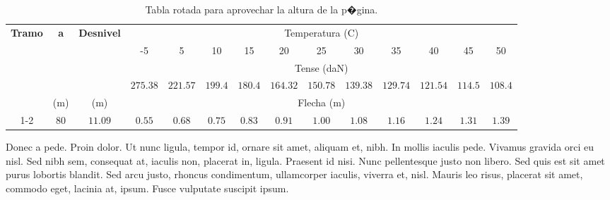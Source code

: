 \begin{sidewaystable}			
	\begin{center}
		\begin{tabular}{|c|c|c|c|c|c|c|c|c|c|c|c|c|c|}
			\hline
				\multirow{5}{1cm}{\scriptsize{\textbf{Tramo}}}	&
				\multirow{4}{0.15cm}{\scriptsize{\textbf{a}}}	&
				\multirow{4}{1.25cm}{\scriptsize{\textbf{Desnivel}}}	&
				\multicolumn{11}{|c|}{\scriptsize{Temperatura (\textdegree C)}}\\
			\cline{4-14}
				&
				&
				&
				\scriptsize{-5} &
				\scriptsize{5} &
				\scriptsize{10} &
				\scriptsize{15} &
				\scriptsize{20} &
				\scriptsize{25} &
				\scriptsize{30} &
				\scriptsize{35} &
				\scriptsize{40} &
					\scriptsize{45} &
					\scriptsize{50} \\
				\cline{4-14}
					&
					&
					&
					\multicolumn{11}{|c|}{\scriptsize{Tense (daN)}}\\
				\cline{4-14}
					&
					&
					&
					\scriptsize{$275.38$} &
					\scriptsize{$221.57$} &
					\scriptsize{$199.4$} &
					\scriptsize{$180.4$} &
					\scriptsize{$164.32$} &
					\scriptsize{$150.78$} &
					\scriptsize{$139.38$} &
					\scriptsize{$129.74$} &
					\scriptsize{$121.54$} &
					\scriptsize{$114.5$} &
					\scriptsize{$108.4$} \\
				\cline{4-14}
					&
					\scriptsize{(m)} &
					\scriptsize{(m)}	&
					\multicolumn{11}{|c|}{\scriptsize{Flecha (m)}}\\
				\hline
				\hline
					\scriptsize{1-2} &
					\scriptsize{80}	&
					\scriptsize{$11.09$}	&							
					\scriptsize{$0.55$} &
					\scriptsize{$0.68$} &
					\scriptsize{$0.75$} &
					\scriptsize{$0.83$} &
					\scriptsize{$0.91$} &
					\scriptsize{$1.00$} &
					\scriptsize{$1.08$} &
					\scriptsize{$1.16$} &
					\scriptsize{$1.24$} &
					\scriptsize{$1.31$} &
					\scriptsize{$1.39$} \\
						
				\hline								
		\end{tabular}
	\end{center}
	\caption[Ejemplo de tabla rotada]{Tabla rotada para aprovechar la altura de la p�gina.}
	\label{cuadro_regulacion_1_2}
\end{sidewaystable}

Donec a pede. Proin dolor. Ut nunc ligula, tempor id, ornare sit amet, aliquam et, nibh. In mollis iaculis pede. Vivamus gravida orci eu nisl. Sed nibh sem, consequat at, iaculis non, placerat in, ligula. Praesent id nisi. Nunc pellentesque justo non libero. Sed quis est sit amet purus lobortis blandit. Sed arcu justo, rhoncus condimentum, ullamcorper iaculis, viverra et, nisl. Mauris leo risus, placerat sit amet, commodo eget, lacinia at, ipsum. Fusce vulputate suscipit ipsum.



